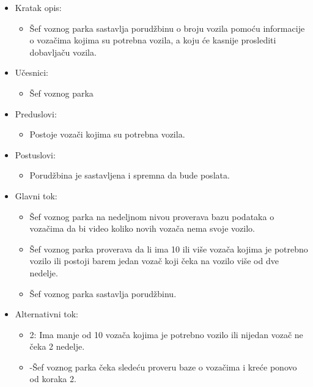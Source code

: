 \begin{itemize}
	\item Kratak opis:
		\begin{itemize}
			\item Šef voznog parka sastavlja porudžbinu o broju vozila pomoću informacije o vozačima kojima su potrebna vozila, a koju će kasnije proslediti dobavljaču vozila.		
		\end{itemize}

	\item Učesnici:
		\begin{itemize}
		    \item Šef voznog parka
		\end{itemize}


	\item Preduslovi:
		\begin{itemize}
		    \item Postoje vozači kojima su potrebna vozila.
		\end{itemize}


	\item Postuslovi:
		\begin{itemize}
			\item Porudžbina je sastavljena i spremna da bude poslata.
	\end{itemize}

	\item Glavni tok:
		\begin{itemize}
		    \item Šef voznog parka na nedeljnom nivou proverava bazu podataka o vozačima da bi video koliko novih vozača nema svoje vozilo.
		    \item Šef voznog parka proverava da li ima 10 ili više vozača kojima je potrebno vozilo ili postoji barem jedan vozač koji čeka na vozilo više od dve nedelje.
		    \item Šef voznog parka sastavlja porudžbinu.
		\end{itemize}

	\item Alternativni tok:
		\begin{itemize}
		    \item 2: Ima manje od 10 vozača kojima je potrebno vozilo ili nijedan vozač ne čeka 2 nedelje.
			\item -Šef voznog parka čeka sledeću proveru baze o vozačima i kreće ponovo od koraka 2.
		\end{itemize}

\end{itemize}

